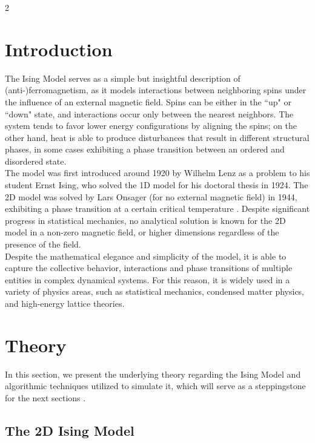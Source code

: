 \documentclass{article}
\begin{document}
\begin{multicols}{2}

\section{Introduction}

The Ising Model serves as a simple but insightful description of (anti-)ferromagnetism, as it models interactions between neighboring spins under the influence of an external magnetic field. Spins can be either in the ``up" or ``down" state, and interactions occur only between the nearest neighbors. The system tends to favor lower energy configurations by aligning the spins; on the other hand, heat is able to produce disturbances that result in different structural phases, in some cases exhibiting a phase transition between an ordered and disordered state.\\

The model was first introduced around 1920 by Wilhelm Lenz as a problem to his student Ernst Ising, who solved the 1D model for his doctoral thesis in 1924. The 2D model was solved by Lars Onsager (for no external magnetic field) in 1944, exhibiting a phase transition at a certain critical temperature \cite{onsager}. Despite significant progress in statistical mechanics, no analytical solution is known for the 2D model in a non-zero magnetic field, or higher dimensions regardless of the presence of the field.\\

Despite the mathematical elegance and simplicity of the model, it is able to capture the collective behavior, interactions and phase transitions of multiple entities in complex dynamical systems. For this reason, it is widely used in a variety of physics areas, such as statistical mechanics, condensed matter physics, and high-energy lattice theories.

\vspace{-1em}
\section{Theory}

In this section, we present the underlying theory regarding the Ising Model and algorithmic techniques utilized to simulate it, which will serve as a steppingstone for the next sections \cite{computational_book}.

\subsection{The 2D Ising Model}
\label{sec_ising}


\end{multicols}
\end{document}
